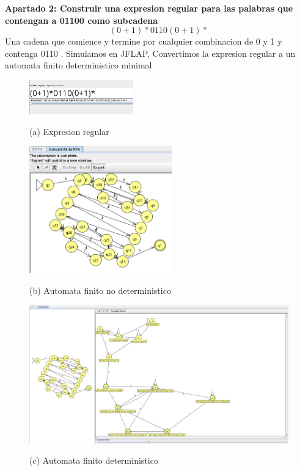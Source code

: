 \documentclass{article}
\begin{document}
        \vspace{\baselineskip} %
        \textbf{Apartado 2: Construir una expresion regular para las palabras que contengan a 01100 como subcadena }
         $$(0+1)*0110(0+1)*$$
        Una cadena que comience y termine por cualquier combinacion de 0 y 1 y contenga 0110
        . Simulamos en JFLAP, Convertimos la expresion regular a un automata finito deterministico minimal

        \begin{figure}[!h]
            \centering
            \includegraphics[width=0.4\textwidth]{./Imagenes/image25.png}
            \label{fig:label4}
            \caption*{(a) Expresion regular}
        \end{figure}

        \begin{figure}[!h]
            \centering
            \includegraphics[width=0.55\textwidth]{./Imagenes/image26.png}
            \label{fig:label4}
            \caption*{(b) Automata finito no deterministico}
        \end{figure}

        \newpage

        \begin{figure}[!h]
            \centering
            \includegraphics[width=1.2\textwidth]{./Imagenes/image27.png}
            \label{fig:label4}
            \caption*{(c) Automata finito  deterministico}
        \end{figure}
\end{document}

